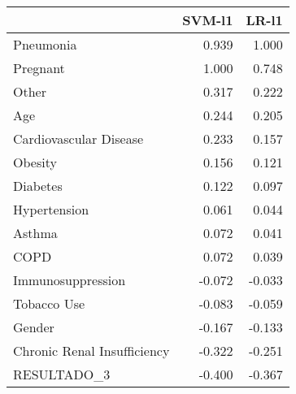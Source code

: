 \begin{tabular}{lrr}
\toprule
{} &  SVM-l1 &  LR-l1 \\
\midrule
Pneumonia                   &   0.939 &  1.000 \\
Pregnant                    &   1.000 &  0.748 \\
Other                       &   0.317 &  0.222 \\
Age                         &   0.244 &  0.205 \\
Cardiovascular Disease      &   0.233 &  0.157 \\
Obesity                     &   0.156 &  0.121 \\
Diabetes                    &   0.122 &  0.097 \\
Hypertension                &   0.061 &  0.044 \\
Asthma                      &   0.072 &  0.041 \\
COPD                        &   0.072 &  0.039 \\
Immunosuppression           &  -0.072 & -0.033 \\
Tobacco Use                 &  -0.083 & -0.059 \\
Gender                      &  -0.167 & -0.133 \\
Chronic Renal Insufficiency &  -0.322 & -0.251 \\
RESULTADO\_3                 &  -0.400 & -0.367 \\
\bottomrule
\end{tabular}
